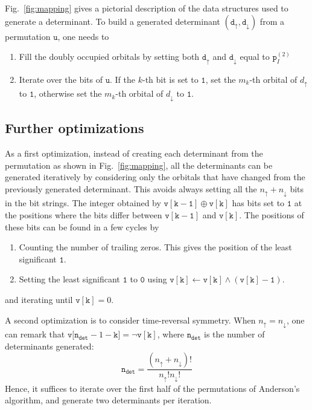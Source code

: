 \documentclass[aip,jcp,reprint,showkeys]{revtex4-1}
\newcommand{\tu}{\mathtt{u}}
\newcommand{\md}{\mathtt{d}}
\newcommand{\mpp}{\mathtt{p}}
\newcommand{\up}{\uparrow}
\newcommand{\dn}{\downarrow}
\newcommand{\one}{{\texttt{1}}}
\newcommand{\zero}{{\texttt{0}}}
\begin{document}
Fig.~\ref{fig:mapping} gives a pictorial description of the data structures used to generate a determinant.
To build a generated determinant $(\md_\up,\md_\dn)$ from a permutation $\tu$, one needs to
\begin{enumerate}
    \item Fill the doubly occupied orbitals by setting both $\md_\up$ and $\md_\dn$
          equal to $\mpp_I^{(2)}$
    \item Iterate over the bits of $\tu$. If the $k$-th bit is set to $\one$,
          set the $m_k$-th orbital of $d_\up$ to $\one$, otherwise set the $m_k$-th orbital
          of $d_\dn$ to $\one$.
\end{enumerate}

\subsection{Further optimizations}

As a first optimization, instead of creating each determinant from the
permutation as shown in Fig.~\ref{fig:mapping}, all the determinants can be
generated iteratively by considering only the orbitals that have changed
from the previously generated determinant. This avoids always setting all the
$n_\up+n_\dn$ bits in the bit strings.
The integer obtained by $\mathtt{v[k-1]} \oplus \mathtt{v[k]}$ has bits
set to $\one$ at the positions where the bits differ between $\mathtt{v[k-1]}$ and
$\mathtt{v[k]}$. The positions of these bits can be found in a few cycles by
\begin{enumerate}
\item Counting the number of trailing zeros. This gives the position of the least significant $\one$.
\item Setting the least significant $\one$ to $\zero$ using
      $\mathtt{v[k] \gets v[k] \wedge (v[k]-1)}$.
\end{enumerate}
and iterating until $\mathtt{v[k]} = 0$. 

A second optimization is to consider time-reversal symmetry. When $n_\up =
n_\dn$, one can remark that ${\mathtt{v[n_{det}}-1-\mathtt{k]} = \neg \mathtt{v[k]}}$, 
where $\mathtt{n_{det}}$ is the number of determinants generated:
\begin{equation}
\mathtt{n_{det}} = \frac{(n_\up +n_\dn)!}{n_\up! n_\dn!}
\end{equation}
Hence, it suffices to iterate over the first half of the permutations of Anderson's
algorithm, and generate two determinants per iteration.
\end{document}
